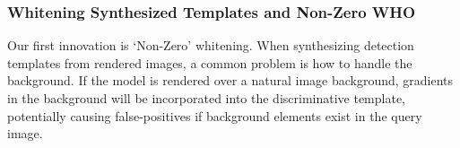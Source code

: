 \documentclass[10pt,twocolumn,letterpaper]{article}
\begin{document}


% 



\subsubsection{Whitening Synthesized Templates and Non-Zero WHO}
\label{sec:nzwho}
Our first innovation is `Non-Zero' whitening. When synthesizing detection
templates from rendered images, a common problem is how to handle the
background. If the model is rendered over a natural image background, gradients
in the background will be incorporated into the discriminative template,
potentially causing false-positives if background elements exist in the query
image.
\end{document}
